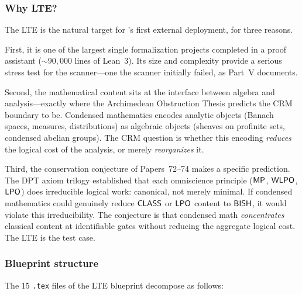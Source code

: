 \subsubsection{Why LTE?}\label{sec:why-lte}

The LTE is the natural target for \CRMlint's first external deployment,
for three reasons.

First, it is one of the largest single formalization projects
completed in a proof assistant (${\sim}90{,}000$ lines of Lean~3).
Its size and complexity provide a serious stress test for the
scanner---one the scanner initially failed, as Part~V documents.

Second, the mathematical content sits at the interface between algebra
and analysis---exactly where the Archimedean Obstruction Thesis
predicts the CRM boundary to be.  Condensed mathematics encodes
analytic objects (Banach spaces, measures, distributions) as algebraic
objects (sheaves on profinite sets, condensed abelian groups).  The
CRM question is whether this encoding \emph{reduces} the logical cost
of the analysis, or merely \emph{reorganizes} it.

Third, the conservation conjecture of Papers~72--74 makes a specific
prediction.  The DPT axiom trilogy established that each omniscience
principle ($\textsf{MP}$, $\textsf{WLPO}$, $\textsf{LPO}$) does irreducible logical work:
canonical, not merely minimal.  If condensed mathematics could
genuinely reduce $\textsf{CLASS}$ or $\textsf{LPO}$ content to $\textsf{BISH}$, it would
violate this irreducibility.  The conjecture is that condensed math
\emph{concentrates} classical content at identifiable gates without
reducing the aggregate logical cost.  The LTE is the test case.

\subsubsection{Blueprint structure}\label{sec:blueprint-structure}

The 15 \texttt{.tex} files of the LTE blueprint decompose as follows:


